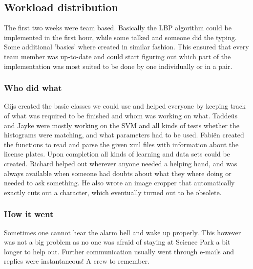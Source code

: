 \documentclass[a4paper]{article}
\begin{document}
\subsection{Workload distribution}

The first two weeks were team based. Basically the LBP algorithm could be
implemented in the first hour, while some talked and someone did the typing.
Some additional 'basics' where created in similar fashion. This ensured that
every team member was up-to-date and could start figuring out which part of the
implementation was most suited to be done by one individually or in a pair.

\subsubsection*{Who did what}
Gijs created the basic classes we could use and helped everyone by keeping
track of what was required to be finished and whom was working on what. 
Tadde\"us and Jayke were mostly working on the SVM and all kinds of tests
whether the histograms were matching, and what parameters had to be used.
Fabi\"en created the functions to read and parse the given xml files with
information about the license plates. Upon completion all kinds of learning
and data sets could be created. Richard helped out wherever anyone needed a
helping hand, and was always available when someone had doubts about what they
where doing or needed to ask something. He also wrote an image cropper that
automatically exactly cuts out a character, which eventually turned out to be
obsolete.

\subsubsection*{How it went}

Sometimes one cannot hear the alarm bell and wake up properly. This however was
not a big problem as no one was afraid of staying at Science Park a bit longer
to help out. Further communication usually went through e-mails and replies
were instantaneous! A crew to remember.


\appendix
\end{document}

